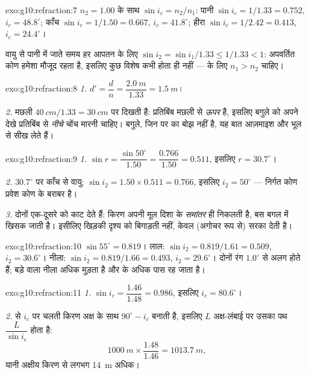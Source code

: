 \begin{solution}{exo:g10:refraction:7}
$n_2 = 1.00$ के साथ $\sin i_c = n_2/n_1$: पानी $\sin i_c = 1/1.33 = 0.752$, $i_c = 48.8^\circ$; काँच $\sin i_c = 1/1.50 = 0.667$, $i_c = 41.8^\circ$; हीरा
$\sin i_c = 1/2.42 = 0.413$, $i_c = 24.4^\circ$।

वायु से पानी में जाते समय हर आपतन के लिए $\sin i_2 = \sin i_1/1.33 \leq 1/1.33 < 1$: अपवर्तित कोण हमेशा
मौजूद रहता है, इसलिए कुछ विशेष कभी होता ही नहीं ---  के लिए $n_1 > n_2$ चाहिए।
\end{solution}

\begin{solution}{exo:g10:refraction:8}
\emph{1.} $d' = \dfrac{d}{n} = \dfrac{\qty{2.0}{m}}{1.33}
= \qty{1.5}{m}$।

\emph{2.} मछली $\qty{40}{cm}/1.33 = \qty{30}{cm}$ पर दिखती है: प्रतिबिंब मछली से \emph{ऊपर} है,
इसलिए बगुले को अपने देखे प्रतिबिंब से \emph{नीचे} चोंच मारनी चाहिए।
बगुले, जिन पर  का बोझ नहीं है, यह बात आज़माइश और
भूल से सीख लेते हैं।
\end{solution}

\begin{solution}{exo:g10:refraction:9}
\emph{1.} $\sin r = \dfrac{\sin 50^\circ}{1.50} = \dfrac{0.766}{1.50}
= 0.511$, इसलिए $r = 30.7^\circ$।

\emph{2.} $30.7^\circ$ पर काँच से वायु: $\sin i_2 = 1.50 \times 0.511 = 0.766$, इसलिए $i_2 = 50^\circ$ --- निर्गत कोण
प्रवेश कोण के बराबर है।

\emph{3.} दोनों  एक-दूसरे को काट देते हैं: किरण अपनी
मूल दिशा के \emph{समांतर} ही निकलती है, बस बगल में खिसक जाती है। इसीलिए
खिड़की दृश्य को बिगाड़ती नहीं, केवल (अगोचर रूप से) सरका देती है।
\end{solution}

\begin{solution}{exo:g10:refraction:10}
$\sin 55^\circ = 0.819$। लाल: $\sin i_2 = 0.819/1.61 = 0.509$, $i_2 = 30.6^\circ$। नीला: $\sin i_2 = 0.819/1.66 = 0.493$, $i_2 = 29.6^\circ$। दोनों रंग $1.0^\circ$ से
अलग होते हैं; बड़े  वाला नीला अधिक मुड़ता है और
 के अधिक पास रह जाता है।
\end{solution}

\begin{solution}{exo:g10:refraction:11}
\emph{1.} $\sin i_c = \dfrac{1.46}{1.48} = 0.986$, इसलिए $i_c = 80.6^\circ$।

\emph{2.}  से $i_c$ पर चलती किरण अक्ष के साथ $90^\circ - i_c$
बनाती है, इसलिए $L$ अक्ष-लंबाई पर उसका पथ $\dfrac{L}{\sin i_c}$ होता है:
\[
\qty{1000}{m} \times \frac{1.48}{1.46} = \qty{1013.7}{m},
\]
यानी अक्षीय किरण से लगभग \qty{14}{m} अधिक।
\end{solution}

